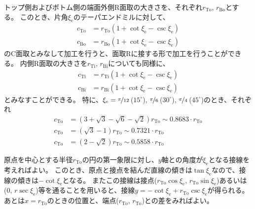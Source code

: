 トップ側およびボトム側の端面外側R面取の大きさを、それぞれ$r_\mathrm{To}$, $r_\mathrm{Bo}$とする。
このとき、片角$\xi_\mathrm e$のテーパエンドミルに対して、
\begin{align*}
  c_\mathrm{To} &= r_\mathrm{To}\left(1+\cot\xi_\mathrm e-\csc\xi_\mathrm e\right)\\
  c_\mathrm{Bo} &= r_\mathrm{Bo}\left(1+\cot\xi_\mathrm e-\csc\xi_\mathrm e\right)
\end{align*}
のC面取とみなして加工を行うと、面取Rに接する形で加工を行うことができる。
内側R面取の大きさを$r_\mathrm{Ti}$, $r_\mathrm{Bi}$についても同様に、
\begin{align*}
  c_\mathrm{Ti} &= r_\mathrm{Ti}\left(1+\cot\xi_\mathrm e-\csc\xi_\mathrm e\right)\\
  c_\mathrm{Bi} &= r_\mathrm{Bi}\left(1+\cot\xi_\mathrm e-\csc\xi_\mathrm e\right)
\end{align*}
とみなすことができる。
特に、$\xi_\mathrm e = \nicefrac\pi{12}$\,($15^\circ$), $\nicefrac\pi6$\,($30^\circ$), $\nicefrac\pi4$\,($45^\circ$)のとき、それぞれ
\begin{align*}
  c_\mathrm{To} &= \left(3+\sqrt3-\sqrt6-\sqrt2\right)r_\mathrm{To} \sim 0.8683\cdot r_\mathrm{To}\\
  c_\mathrm{To} &= \left(\sqrt3-1\right)r_\mathrm{To} \sim 0.7321\cdot r_\mathrm{To}\\
  c_\mathrm{To} &= \left(2-\sqrt2\right)r_\mathrm{To} \sim 0.5858\cdot r_\mathrm{To}
\end{align*}
\begin{hosoku}
原点を中心とする半径$r_\mathrm{To}$の円の第一象限に対し、$y$軸との角度が$\xi_\mathrm e$となる接線を考えればよい。
このとき、原点と接点を結んだ直線の傾きは$\tan\xi_\mathrm e$なので、接線の傾きは$-\cot\xi_\mathrm e$となる。
またこの接線は接点($r_\mathrm{To}\cos\xi_\mathrm e$, $r_\mathrm{To}\sin\xi_\mathrm e$)あるいは(0, $r\sec\xi_\mathrm e$)等を通ることを用いると、接線$y = -\cot\xi_\mathrm e+r_\mathrm{To}\csc\xi_\mathrm e$が得られる。
あとは$x = r_\mathrm{To}$のときの位置と、端点($r_\mathrm{To}$, $r_\mathrm{To}$)との差をみればよい。
\end{hosoku}




